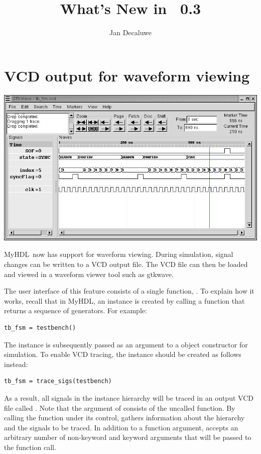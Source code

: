 \documentclass{howto}
\title{What's New in \myhdl\ 0.3}
\author{Jan Decaluwe}
\newcommand{\myhdl}{\protect \mbox{MyHDL}}
\begin{document}
\maketitle
\tableofcontents


\section{VCD output for waveform viewing\label{section-wave}}

\ifpdf
\includegraphics{tbfsm.png}
\fi

\myhdl\ now has support for waveform viewing. During simulation, signal
changes can be written to a VCD output file.  The VCD file can then be
loaded and viewed in a waveform viewer tool such as gtkwave.

The user interface of this feature consists of a single function,
.  To explain how it works, recall that in
\myhdl{}, an instance is created by calling a function that returns a
sequence of generators. For example:

\begin{verbatim}
tb_fsm = testbench()
\end{verbatim}

The  instance is subsequently passed 
as an argument to a  object constructor
for simulation. To enable VCD tracing, the instance should 
be created as follows instead:

\begin{verbatim}
tb_fsm = trace_sigs(testbench)
\end{verbatim}

As a result, all signals in the instance hierarchy will be traced in
an output VCD file called . Note that the argument of
 consists of the uncalled function. By calling
the function under its control,  gathers
information about the hierarchy and the signals to be traced.  In
addition to a function argument,  accepts an
arbitrary number of non-keyword and keyword arguments that will be
passed to the function call.
\end{document}
